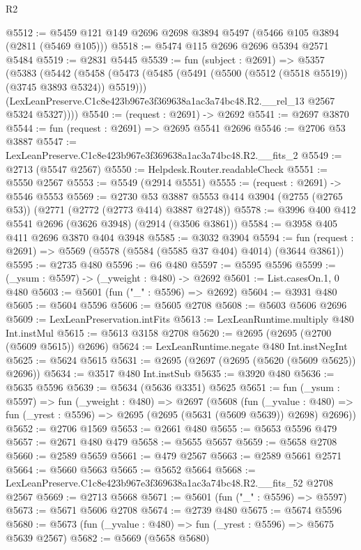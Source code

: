 \begin{lexlean}{R2}
\begin{coremodule}
@5512 := @5459 @121 @149 @2696 @2698 @3894 @5497 (@5466 @105 @3894 (@2811 (@5469 @105)))
@5518 := @5474 @115 @2696 @2696 @5394 @2571 @5484
@5519 := @2831 @5445
@5539 := fun (subject : @2691) =>
  @5357
    (@5383
      (@5442
        (@5458
          (@5473 (@5485 (@5491 (@5500 (@5512 (@5518 @5519)) (@3745 @3893 @5324)) @5519)))
          (LexLeanPreserve.C1c8e423b967e3f369638a1ac3a74bc48.R2.__rel_13 @2567 @5324 @5327))))
@5540 := (request : @2691) -> @2692
@5541 := @2697 @3870
@5544 := fun (request : @2691) => @2695 @5541 @2696
@5546 := @2706 @53 @3887
@5547 := LexLeanPreserve.C1c8e423b967e3f369638a1ac3a74bc48.R2.__fits_2
@5549 := @2713 (@5547 @2567)
@5550 := Helpdesk.Router.readableCheck
@5551 := @5550 @2567
@5553 := @5549 (@2914 @5551)
@5555 := (request : @2691) -> @5546 @5553
@5569 := @2730
    @53
    @3887
    @5553
    @414
    @3904
    (@2755 (@2765 @53))
    (@2771 (@2772 (@2773 @414) @3887 @2748))
@5578 := @3996 @400 @412 @5541 @2696 (@3626 @3948) (@2914 (@3506 @3861))
@5584 := @3958 @405 @411 @2696 @3870 @404 @3948
@5585 := @3032 @3904
@5594 := fun (request : @2691) => @5569 (@5578 (@5584 (@5585 @37 @404) @4014) (@3644 @3861))
@5595 := @2735 @480
@5596 := @6 @480
@5597 := @5595 @5596
@5599 := (_ysum : @5597) -> (_yweight : @480) -> @2692
@5601 := List.casesOn.{1, 0} @480
@5603 := @5601 (fun ("_" : @5596) => @2692)
@5604 := @3931 @480
@5605 := @5604 @5596
@5606 := @5605 @2708
@5608 := @5603 @5606 @2696
@5609 := LexLeanPreservation.intFits
@5613 := LexLeanRuntime.multiply @480 Int.instMul
@5615 := @5613 @3158 @2708
@5620 := @2695 (@2695 (@2700 (@5609 @5615)) @2696)
@5624 := LexLeanRuntime.negate @480 Int.instNegInt
@5625 := @5624 @5615
@5631 := @2695 (@2697 (@2695 (@5620 (@5609 @5625)) @2696))
@5634 := @3517 @480 Int.instSub
@5635 := @3920 @480
@5636 := @5635 @5596
@5639 := @5634 (@5636 @3351) @5625
@5651 := fun (_ysum : @5597) =>
  fun (_yweight : @480) =>
  @2697
    (@5608
      (fun (_yvalue : @480) =>
      fun (_yrest : @5596) => @2695 (@2695 (@5631 (@5609 @5639)) @2698) @2696))
@5652 := @2706 @1569
@5653 := @2661 @480
@5655 := @5653 @5596 @479
@5657 := @2671 @480 @479
@5658 := @5655 @5657
@5659 := @5658 @2708
@5660 := @2589 @5659
@5661 := @479 @2567
@5663 := @2589 @5661 @2571
@5664 := @5660 @5663
@5665 := @5652 @5664
@5668 := LexLeanPreserve.C1c8e423b967e3f369638a1ac3a74bc48.R2.__fits_52 @2708 @2567
@5669 := @2713 @5668
@5671 := @5601 (fun ("_" : @5596) => @5597)
@5673 := @5671 @5606 @2708
@5674 := @2739 @480
@5675 := @5674 @5596
@5680 := @5673 (fun (_yvalue : @480) => fun (_yrest : @5596) => @5675 @5639 @2567)
@5682 := @5669 (@5658 @5680)

\end{coremodule}
\end{lexlean}
